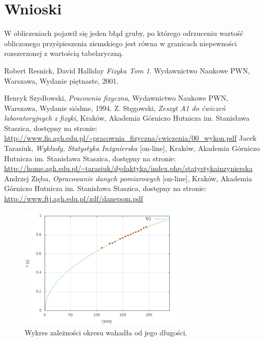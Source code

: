 \documentclass{article}
\begin{document}
\section{Wnioski}
	W obliczeniach pojawił się jeden błąd gruby, po którego odrzuceniu wartość obliczonego przyśpieszenia ziemskiego jest równa w granicach niepewności rozszerzonej z wartością tabelaryczną.
	



\begin{thebibliography}{9}
 
  Robert Resnick, David Halliday
  \emph{Fizyka Tom 1}.
    Wydawnictwo Naukowe PWN, Warszawa,
  Wydanie piętnaste,
  2001.


 Henryk Szydłowski,
 \emph{Pracownia fizyczna}, Wydawnictwo Naukowe PWN, Warszawa, Wydanie siódme, 1994.
  Z. Stęgowski,
  \emph{Zeszyt A1 do ćwiczeń laboratoryjnych z fizyki}, Kraków, Akademia Górniczo Hutnicza im. Stanisława Staszica, dostępny na stronie:\\
  \url{http://www.fis.agh.edu.pl/~pracownia_fizyczna/cwiczenia/00_wykon.pdf}
 Jacek Tarasiuk,
 \emph{Wykłady, Statystyka Inżynierska} [on-line], Kraków, Akademia Górniczo Hutnicza im. Stanisława Staszica, dostępny na stronie:\\
  \url{http://home.agh.edu.pl/~tarasiuk/dydaktyka/index.php/statystykainzynierska}
 Andrzej Zięba,
 \emph{Opracowanie danych pomiarowych} [on-line], Kraków, Akademia Górniczo Hutnicza im. Stanisława Staszica, dostępny na stronie:\\
  \url{http://www.ftj.agh.edu.pl/zdf/danepom.pdf}
  \label{statystyka}



\end{thebibliography}
\vspace{2cm}
\newpage
	\begin{figure}[p]
		\centering
		\includegraphics[width=0.7\textwidth]{wykres_T/wykres1.png}
		\caption{Wykres zależności okresu wahadła od jego długości.}
		\label{wykres1}
	\end{figure}
	
\end{document}
